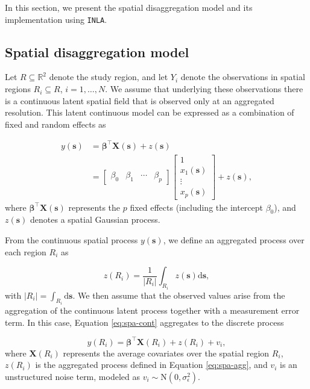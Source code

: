 In this section, we present the spatial disaggregation model and its implementation using \texttt{INLA}.

\subsection{Spatial disaggregation model}\label{sec:uni-mod}

Let \(R \subseteq \mathbb{R}^2\) denote the study region, and let \(Y_i\) denote the observations in spatial regions \(R_i \subseteq R\), \(i=1,\ldots,N\). We assume that underlying these observations there is a continuous latent spatial field that is observed only at an aggregated resolution. This latent continuous model can be expressed as a combination of fixed and random effects as

\begin{equation}
\begin{aligned}
y(\mathbf{s})
&= \boldsymbol{\beta}^\top \mathbf{X}(\mathbf{s}) + z(\mathbf{s}) \\
&=
\begin{bmatrix}
\beta_0 & \beta_1 & \cdots & \beta_p
\end{bmatrix}
\begin{bmatrix}
1 \\ x_1(\mathbf{s}) \\ \vdots \\ x_p(\mathbf{s})
\end{bmatrix}
+ z(\mathbf{s}),
\end{aligned}
\label{eq:spa-cont}
\end{equation}
where \(\boldsymbol{\beta}^\top\mathbf{X}(\mathbf{s})\) represents the \(p\) fixed effects (including the intercept \(\beta_0\)), and \(z(\mathbf{s})\) denotes a spatial Gaussian process.

From the continuous spatial process \(y(\mathbf{s})\), we define an aggregated process over each region \(R_i\) as

\begin{equation}
z(R_i) = \frac{1}{|R_i|}\int_{R_i} z(\mathbf{s}) \mathrm{d}\mathbf{s},
\label{eq:spa-agg}
\end{equation}
with \(|R_i| = \int_{R_i} \mathrm{d}\mathbf{s}\). We then assume that the observed values arise from the aggregation of the continuous latent process together with a measurement error term. In this case, Equation \eqref{eq:spa-cont} aggregates to the discrete process

\begin{equation}
y(R_i) = \boldsymbol{\beta}^\top \mathbf{X}(R_i) + z(R_i) + v_i,
\label{eq:spa-areal}
\end{equation}
where \(\mathbf{X}(R_i)\) represents the average covariates over the spatial region \(R_i\), \(z(R_i)\) is the aggregated process defined in Equation \eqref{eq:spa-agg}, and \(v_i\) is an unstructured noise term, modeled as \(v_i \sim \mathrm{N}(0, \sigma^2_{\epsilon})\).

